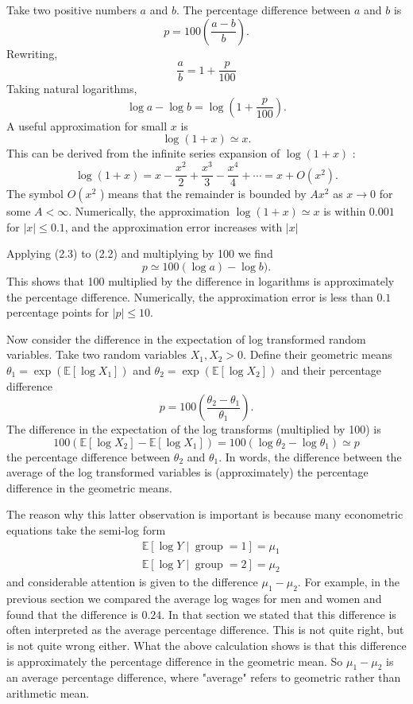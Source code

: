 \documentclass[10pt]{article}
\begin{document}
Take two positive numbers $a$ and $b$. The percentage difference between $a$ and $b$ is
$$
p=100\left(\frac{a-b}{b}\right) .
$$
Rewriting,
$$
\frac{a}{b}=1+\frac{p}{100}
$$
Taking natural logarithms,
$$
\log a-\log b=\log \left(1+\frac{p}{100}\right) .
$$
A useful approximation for small $x$ is
$$
\log (1+x) \simeq x .
$$
This can be derived from the infinite series expansion of $\log (1+x)$ :
$$
\log (1+x)=x-\frac{x^{2}}{2}+\frac{x^{3}}{3}-\frac{x^{4}}{4}+\cdots=x+O\left(x^{2}\right) .
$$
The symbol $O\left(x^{2}\right.$ ) means that the remainder is bounded by $A x^{2}$ as $x \rightarrow 0$ for some $A<\infty$. Numerically, the approximation $\log (1+x) \simeq x$ is within $0.001$ for $|x| \leq 0.1$, and the approximation error increases with $|x|$

Applying (2.3) to (2.2) and multiplying by 100 we find
$$
p \simeq 100(\log a)-\log b) .
$$
This shows that 100 multiplied by the difference in logarithms is approximately the percentage difference. Numerically, the approximation error is less than $0.1$ percentage points for $|p| \leq 10$.

Now consider the difference in the expectation of log transformed random variables. Take two random variables $X_{1}, X_{2}>0$. Define their geometric means $\theta_{1}=\exp \left(\mathbb{E}\left[\log X_{1}\right]\right)$ and $\theta_{2}=\exp \left(\mathbb{E}\left[\log X_{2}\right]\right)$ and their percentage difference
$$
p=100\left(\frac{\theta_{2}-\theta_{1}}{\theta_{1}}\right) .
$$
The difference in the expectation of the log transforms (multiplied by 100) is
$$
100\left(\mathbb{E}\left[\log X_{2}\right]-\mathbb{E}\left[\log X_{1}\right]\right)=100\left(\log \theta_{2}-\log \theta_{1}\right) \simeq p
$$
the percentage difference between $\theta_{2}$ and $\theta_{1}$. In words, the difference between the average of the log transformed variables is (approximately) the percentage difference in the geometric means.

The reason why this latter observation is important is because many econometric equations take the semi-log form
$$
\begin{aligned}
&\mathbb{E}[\log Y \mid \operatorname{group}=1]=\mu_{1} \\
&\mathbb{E}[\log Y \mid \operatorname{group}=2]=\mu_{2}
\end{aligned}
$$
and considerable attention is given to the difference $\mu_{1}-\mu_{2}$. For example, in the previous section we compared the average log wages for men and women and found that the difference is $0.24$. In that section we stated that this difference is often interpreted as the average percentage difference. This is not quite right, but is not quite wrong either. What the above calculation shows is that this difference is approximately the percentage difference in the geometric mean. So $\mu_{1}-\mu_{2}$ is an average percentage difference, where "average" refers to geometric rather than arithmetic mean.
\end{document}
